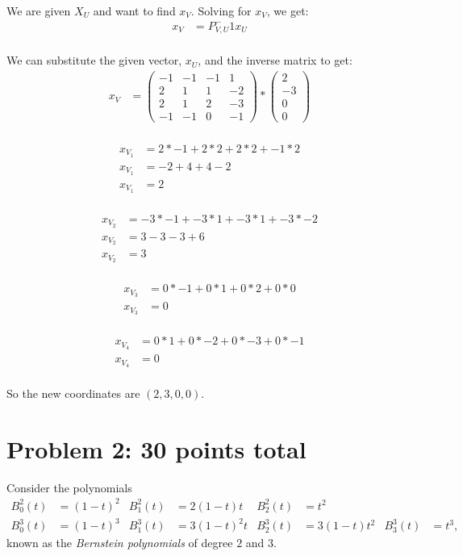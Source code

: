 \documentclass[12pt]{article}
\begin{document}
We are given  $X_U$ and want to find $x_V$. Solving for $x_V$, we get: 
\begin{align*}
    x_V &= P_{V,U}^-1x_U \\
\end{align*}

We can substitute the given vector, $x_U$, and the inverse matrix to get:
\begin{align*}
    x_V &= \begin{pmatrix}
    -1 & -1 & -1 & 1\\
    2 & 1 & 1 & -2 \\
    2 & 1 & 2 & -3 \\
    -1 & -1 & 0 & -1
    \end{pmatrix} * \begin{pmatrix}
    2 \\
    -3 \\
    0 \\
    0 
    \end{pmatrix} \\
    \end{align*}

\begin{align*}
    x_{V_{1}} &= 2 * -1 + 2 * 2 + 2 * 2 + -1 * 2 \\
    x_{V_{1}} &= -2 + 4 + 4 - 2 \\
    x_{V_{1}} &= 2 \\
\end{align*}

\begin{align*}
    x_{V_{2}} &= -3 * -1 + -3 * 1 + -3 * 1 + -3 * -2 \\
    x_{V_{2}} &=  3 - 3 - 3 + 6\\
    x_{V_{2}} &= 3 \\
\end{align*}

\begin{align*}
    x_{V_{3}} &= 0 * -1 + 0 * 1 + 0 * 2 + 0 * 0 \\
    x_{V_{3}} &= 0 \\
\end{align*}

\begin{align*}
    x_{V_{4}} &= 0 * 1 + 0 * -2 + 0 * -3 + 0 * -1 \\
    x_{V_{4}} &= 0 \\
\end{align*}

So the new coordinates are $(2,3,0,0)$.
\section*{Problem 2: 30 points total}
\label{prob-3.3}
Consider the polynomials
\begin{align*}
B_0^2(t) & = (1 - t)^2  & B_1^2(t)  & = 2(1 - t)t & B_2^2(t) & = t^2 
&   &    \\
B_0^3(t) & = (1 - t)^3  & B_1^3(t) & = 3(1 - t)^2t & B_2^3(t) & = 3(1 - t)t^2 
 &  B_3^3(t) & = t^3,
\end{align*}
known as the {\it Bernstein polynomials\/} of degree $2$ and $3$.
\end{document}
